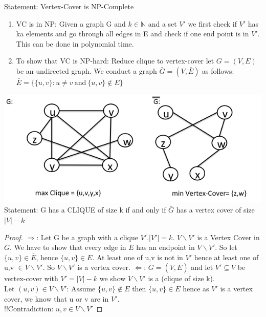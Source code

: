 \underline{Statement:} Vertex-Cover is NP-Complete \\
\begin{enumerate}[label={\arabic*.}]
  \item VC is in NP: Given a graph G and $k \in \mathbb{N}$ and a set $V'$ we first check if $V'$ has ka elements and go through all edges in E and check if one end point is in $V'$. This can be done in polynomial time.
  \item To show that VC is NP-hard: Reduce clique to vertex-cover let $G=(V,E)$ be an undirected graph. We conduct a graph $\bar{G}=(V, \bar{E})$ as follows: $\bar{E} = \{ \{ u,v \} : u \neq v ~\text{and}~\{ u,v \} \not\in E \}$ 
\end{enumerate}
\includegraphics[scale=0.5]{diagrams/clique_vertex} \\
Statement: G has a CLIQUE of size k if and only if $\bar{G}$ has a vertex cover of size $\left| V \right|-k$

\begin{proof}
 $\Rightarrow$: Let G be a graph with a clique $V'. \left| V' \right| = k$. $V \backslash V'$ is a Vertex Cover in $\bar{G}$. We have to show that every edge in $\bar{E}$ has an endpoint in $V \backslash V'$. So let $\{ u,v \} \in \bar{E}$, hence $\{ u,v \} \in E$. At least one of u,v is not in $V'$ hence at least one of u,v $\in V \backslash V'$. So $V \backslash V'$ is a vertex cover.
 $\Leftarrow$: $\bar{G}=(V,\bar{E})$ and let $V' \subseteq V$ be vertex-cover with $V' = \left| V \right| -k$ we show  $V \backslash V'$ is a (clique of size k).\\
 Let $(u,v) \in V \backslash V'$: Assume $\{ u,v\} \not\in E$ then $\{ u,v \} \in \bar{E}$ hence as $V'$ is a vertex cover, we know that u or v are in $V'$.\\
 !!Contradiction: $u,v \in V \backslash V'$
\end{proof}  
